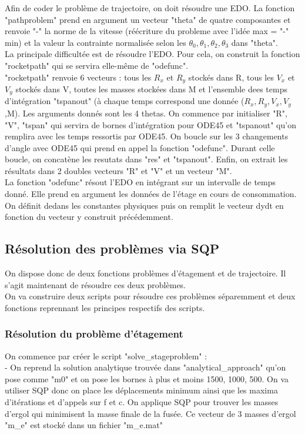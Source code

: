 Afin de coder le problème de trajectoire, on doit résoudre une EDO. La fonction "pathproblem" prend en argument un vecteur "theta" de quatre composantes et renvoie "-" la norme de la vitesse (réécriture du probleme avec l'idée max = "-" min) et la valeur la contrainte normalisée selon les $\theta_0, \theta_1, \theta_2, \theta_3$ dans "theta". \\
La principale difficultée est de résoudre l'EDO. Pour cela, on construit la fonction "rocketpath" qui se servira elle-même de "odefunc".\\
"rocketpath" renvoie 6 vecteurs : tous les $R_x$ et $R_y$ stockés dans R, tous les $V_x$ et $V_y$ stockés dans V, toutes les masses stockées dans M et l'ensemble dees temps d'intégration "tspanout" (à chaque temps correspond une donnée ($R_x,R_y,V_x,V_y$,M). Les arguments donnés sont les 4 thetas. On commence par initialiser "R", "V", "tspan" qui servira de bornes d'intégration pour ODE45 et "tspanout" qu'on remplira avec les temps ressortis par ODE45. On boucle sur les 3 changements d'angle avec ODE45 qui prend en appel la fonction "odefunc". Durant celle boucle, on concatène les resutats dans "res" et "tspanout". Enfin, on extrait les résultats dans 2 doubles vecteurs "R" et "V" et un vecteur "M".\\

La fonction "odefunc" résout l'EDO en intégrant sur un intervalle de temps donné. Elle prend en argument les données de l'étage en cours de consommation. On définit dedans les constantes physiques puis on remplit le vecteur dydt en fonction du vecteur y construit précédemment.\medbreak

\subsection{Résolution des problèmes via SQP}\medbreak
On dispose donc de deux fonctions problèmes d'étagement et de trajectoire. Il s'agit maintenant de résoudre ces deux problèmes.\\
On va construire deux scripts pour résoudre ces problèmes séparemment et deux fonctions reprennant les principes respectifs des scripts.\medbreak


\subsubsection{Résolution du problème d'étagement}\medbreak

On commence par créer le script "solve\_stageproblem" : \\
\indent - On reprend la solution analytique trouvée dans "analytical\_approach" qu'on pose comme "m0" et on pose les bornes à plus et moins 1500, 1000, 500. On va utiliser SQP donc on place les déplacements minimum ainsi que les maxima d'itérations et d'appels sur f et c. On applique SQP pour trouver les masses d'ergol qui minimisent la masse finale de la fusée. Ce vecteur de 3 masses d'ergol "m\_e" est stocké dans un fichier "m\_e.mat"\medbreak

